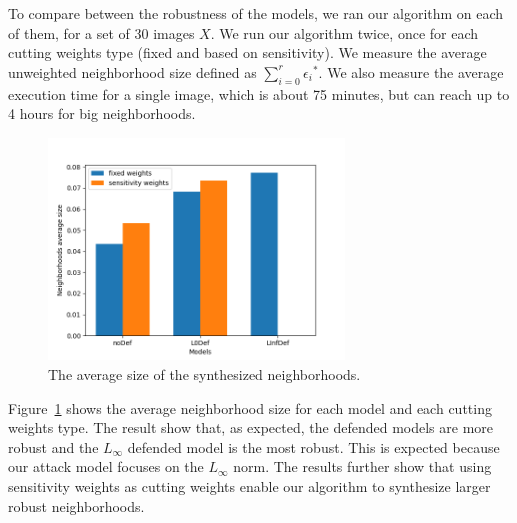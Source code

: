 To compare between the robustness of the models, we ran our algorithm on each of them, for a set of 30 images $X$.
We run our algorithm twice, once for each cutting weights type (fixed and based on sensitivity).
We measure the average unweighted neighborhood size defined as $\sum_{i=0}^{r}{{\epsilon_i}^*}$.
We also measure the average execution time for a single image, which is about 75 minutes, but can reach up to 4 hours for big neighborhoods.
\begin{figure}
    \centering
    \includegraphics[width=0.7\textwidth]{neighborhoods_average_size.png}
    \caption{The average size of the synthesized neighborhoods.}
    \label{fig:neighborhoods_average_size}
\end{figure}
Figure~\ref{fig:neighborhoods_average_size} shows the average neighborhood size for each model and each cutting weights type.
The result show that, as expected, the defended models are more robust and the $L_{\infty}$ defended model is the most robust.
This is expected because our attack model focuses on the $L_{\infty}$ norm.
 The results further show that using sensitivity weights as cutting weights enable our algorithm to synthesize larger robust neighborhoods.
%

